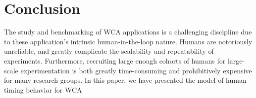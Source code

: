 \section{Conclusion}\label{sec:conclusion}

The study and benchmarking of \ac{WCA} applications is a challenging discipline due to these application's intrinsic human-in-the-loop nature.
Humans are notoriously unreliable, and greatly complicate the scalability and repeatability of experiments.
Furthermore, recruiting large enough cohorts of humans for large-scale experimentation is both greatly time-consuming and prohibitively expensive for many research groups.
In this paper, we have presented the \edgedroid{} model of human timing behavior for \ac{WCA}
